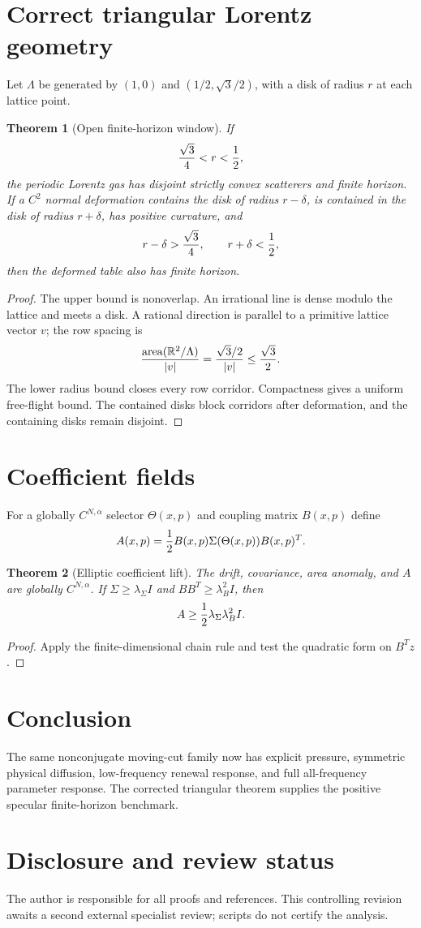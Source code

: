 \documentclass[11pt,reqno]{amsart}
\newtheorem{theorem}{Theorem}[section]
\theoremstyle{definition}
\theoremstyle{remark}
\newcommand{\R}{\mathbb R}
\newcommand{\abs}[1]{\left\lvert #1\right\rvert}
\begin{document}
\section{Correct triangular Lorentz geometry}\label{sec:triangle}
Let $\Lambda$ be generated by $(1,0)$ and $(1/2,\sqrt3/2)$, with a disk of
radius $r$ at each lattice point.

\begin{theorem}[Open finite-horizon window]\label{thm:triangle}
If
\[
 {\sqrt3\over4}<r<{1\over2},
\]
the periodic Lorentz gas has disjoint strictly convex scatterers and finite
horizon.  If a $C^2$ normal deformation contains the disk of radius
$r-\delta$, is contained in the disk of radius $r+\delta$, has positive
curvature, and
\[
 r-\delta>{\sqrt3\over4},
 \qquad r+\delta<{1\over2},
\]
then the deformed table also has finite horizon.
\end{theorem}

\begin{proof}
The upper bound is nonoverlap.  An irrational line is dense modulo the lattice
and meets a disk.  A rational direction is parallel to a primitive lattice
vector $v$; the row spacing is
\[
 {\operatorname{area}(\R^2/\Lambda)\over\abs v}
 ={\sqrt3/2\over\abs v}\le{\sqrt3\over2}.
\]
The lower radius bound closes every row corridor.  Compactness gives a uniform
free-flight bound.  The contained disks block corridors after deformation,
and the containing disks remain disjoint.
\end{proof}

\section{Coefficient fields}
For a globally $C^{N,\alpha}$ selector $\Theta(x,p)$ and coupling matrix
$B(x,p)$ define
\[
 A(x,p)={1\over2}B(x,p)\Sigma(\Theta(x,p))B(x,p)^T.
\]

\begin{theorem}[Elliptic coefficient lift]
The drift, covariance, area anomaly, and $A$ are globally $C^{N,\alpha}$.  If
$\Sigma\ge\lambda_\Sigma I$ and $BB^T\ge\lambda_B^2I$, then
\[
 A\ge{1\over2}\lambda_\Sigma\lambda_B^2I.
\]
\end{theorem}

\begin{proof}
Apply the finite-dimensional chain rule and test the quadratic form on
$B^Tz$.
\end{proof}

\section{Conclusion}
The same nonconjugate moving-cut family now has explicit pressure, symmetric
physical diffusion, low-frequency renewal response, and full all-frequency
parameter response.  The corrected triangular theorem supplies the positive
specular finite-horizon benchmark.

\section*{Disclosure and review status}
The author is responsible for all proofs and references.  This controlling
revision awaits a second external specialist review; scripts do not certify
the analysis.



\end{document}
